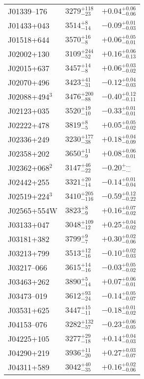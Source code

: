 \documentclass{aa}
\begin{document}
\begin{appendix}
\begin{center}
\begin{xtabular}{lll}
J01339--176 & $3279_{-23}^{+118}$ & $+0.04_{-0.06}^{+0.06}$ \\
J01433+043 & $3514_{-14}^{+8}$ & $-0.09_{-0.03}^{+0.01}$ \\
J01518+644 & $3570_{-8}^{+16}$ & $+0.06_{-0.01}^{+0.05}$ \\
J02002+130 & $3109_{-52}^{+244}$ & $+0.16_{-0.13}^{+0.06}$ \\
J02015+637 & $3457_{-8}^{+14}$ & $+0.06_{-0.02}^{+0.03}$ \\
J02070+496 & $3423_{-31}^{+41}$ & $-0.12_{-0.03}^{+0.04}$ \\
J02088+494$^{3}$ & $3476_{-88}^{+200}$ & $-0.40_{-0.11}^{+0.12}$ \\
J02123+035 & $3520_{-10}^{+19}$ & $-0.33_{-0.01}^{+0.01}$ \\
J02222+478 & $3819_{-5}^{+8}$ & $+0.05_{-0.02}^{+0.05}$ \\
J02336+249 & $3230_{-38}^{+177}$ & $+0.18_{-0.09}^{+0.04}$ \\
J02358+202 & $3650_{-9}^{+11}$ & $+0.08_{-0.01}^{+0.06}$ \\
J02362+068$^{2}$ & $3147_{-22}^{+46}$ & $-0.20_{-...}^{+...}$ \\
J02442+255 & $3321_{-14}^{+20}$ & $-0.14_{-0.04}^{+0.01}$ \\
J02519+224$^{3}$ & $3410_{-116}^{+205}$ & $-0.59_{-0.22}^{+0.12}$ \\
J02565+554W & $3823_{-9}^{+8}$ & $+0.16_{-0.02}^{+0.07}$ \\
J03133+047 & $3048_{-12}^{+109}$ & $+0.25_{-0.02}^{+0.04}$ \\
J03181+382 & $3799_{-7}^{+9}$ & $+0.30_{-0.06}^{+0.02}$ \\
J03213+799 & $3513_{-16}^{+12}$ & $-0.10_{-0.03}^{+0.02}$ \\
J03217--066 & $3615_{-16}^{+14}$ & $-0.03_{-0.02}^{+0.05}$ \\
J03463+262 & $3890_{-14}^{+5}$ & $+0.07_{-0.01}^{+0.06}$ \\
J03473--019 & $3612_{-24}^{+93}$ & $-0.14_{-0.07}^{+0.05}$ \\
J03531+625 & $3447_{-11}^{+15}$ & $-0.18_{-0.02}^{+0.01}$ \\
J04153--076 & $3282_{-57}^{+132}$ & $-0.23_{-0.05}^{+0.06}$ \\
J04225+105 & $3277_{-18}^{+29}$ & $+0.14_{-0.03}^{+0.04}$ \\
J04290+219 & $3936_{-20}^{+11}$ & $+0.27_{-0.07}^{+0.03}$ \\
J04311+589 & $3042_{-35}^{+40}$ & $+0.16_{-0.06}^{+0.02}$ \\

\end{xtabular}
\end{center}
\end{appendix}
\end{document}
